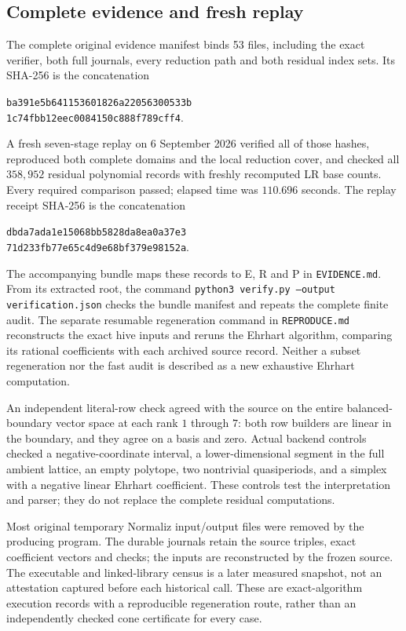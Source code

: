 \documentclass[11pt]{article}
\begin{document}
\subsection{Complete evidence and fresh replay}
The complete original evidence manifest binds 53 files, including the
exact verifier, both full journals, every reduction path and both residual
index sets. Its SHA-256 is the concatenation
\begin{center}
\texttt{ba391e5b641153601826a22056300533b}\\
\texttt{1c74fbb12eec0084150c888f789cff4}.
\end{center}
A fresh seven-stage replay on 6 September 2026 verified all of those hashes,
reproduced both complete domains and the local reduction cover, and checked
all $358,952$ residual polynomial records with freshly recomputed LR base
counts. Every required comparison passed; elapsed time was $110.696$ seconds.
The replay receipt SHA-256 is the concatenation
\begin{center}
\texttt{dbda7ada1e15068bb5828da8ea0a37e3}\\
\texttt{71d233fb77e65c4d9e68bf379e98152a}.
\end{center}
The accompanying bundle maps these records to E, R and P in
\texttt{EVIDENCE.md}. From its extracted root, the command
\texttt{python3 verify.py --output verification.json} checks the bundle
manifest and repeats the complete finite audit. The separate resumable
regeneration command in \texttt{REPRODUCE.md} reconstructs the exact hive
inputs and reruns the Ehrhart algorithm, comparing its rational coefficients
with each archived source record. Neither a subset regeneration nor the
fast audit is described as a new exhaustive Ehrhart computation.

An independent literal-row check agreed with the source on the entire
balanced-boundary vector space at each rank $1$ through $7$: both row
builders are linear in the boundary, and they agree on a basis and zero.
Actual backend controls checked a negative-coordinate interval, a
lower-dimensional segment in the full ambient lattice, an empty polytope,
two nontrivial quasiperiods, and a simplex with a negative linear Ehrhart
coefficient. These controls test the interpretation and parser; they do
not replace the complete residual computations.

Most original temporary Normaliz input/output files were removed by the
producing program. The durable journals retain the source triples, exact
coefficient vectors and checks; the inputs are reconstructed by the frozen
source. The executable and linked-library census is a later measured
snapshot, not an attestation captured before each historical call.
These are exact-algorithm execution records with a reproducible regeneration
route, rather than an independently checked cone certificate for every case.
\end{document}
